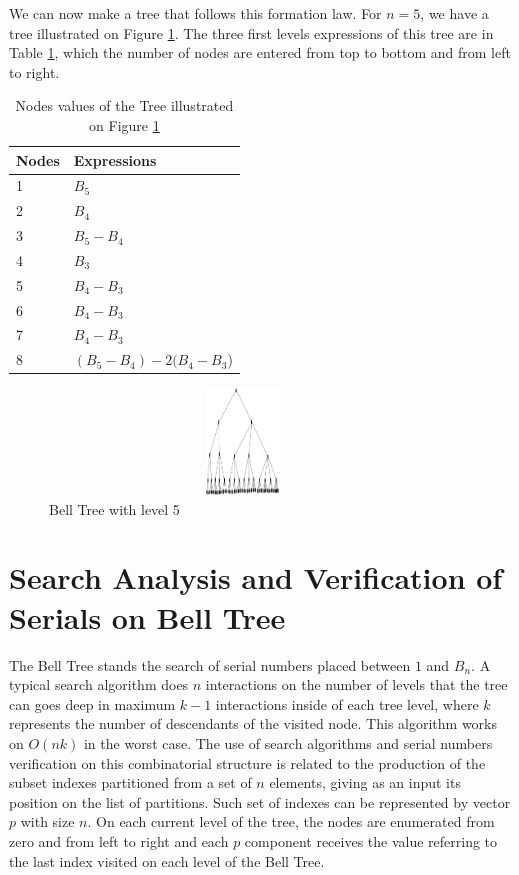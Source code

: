 \documentclass {amsart}
\begin{document}
We can now make a tree that follows this formation law. For {$n = 5$},
we have a tree illustrated on Figure \ref{a1}. The three first levels
expressions of this tree are in Table \ref{t1}, which the number of nodes
are entered from top to bottom and from left to right.

\begin{table}[!hbp]
  \caption{Nodes values of the Tree illustrated on Figure \ref{a1}}
  \label{t1}
\begin{tabular}{l|l}
 \hline
   Nodes  & Expressions  \\
 \hline
    1   & {$B_5$}\\
  \hline
    2   & {$B_4$}\\
  \hline
    3   & {$B_5 - B_4$}\\
  \hline
    4   & {$B_3$}\\
  \hline
    5   & {$B_4 - B_3$}\\
  \hline
    6   & {$B_4 - B_3$}\\
  \hline
    7   & {$B_4 - B_3$}\\
  \hline
    8   & {$(B_5 - B_4) - 2(B_4 - B_3$)}\\
 \end{tabular}
\end{table}

\begin{figure}
  \includegraphics[width=290pt,height=80pt]{BT5}
  \caption{Bell Tree with level 5}\label{a1}
\end{figure}

\section*{Search Analysis and Verification of  Serials on Bell Tree}

The Bell Tree stands the search of serial numbers placed between
{$1$} and {$B_n$}. A typical search algorithm does {$n$}
interactions on the number of levels that the tree can goes deep
in maximum {$k-1$} interactions inside of each tree level, where
{$k$} represents the number of descendants of the visited node.
This algorithm works on {$O(nk)$} in the worst case. The use of
search algorithms and serial numbers verification on this
combinatorial structure is related to the production of the subset
indexes partitioned from a set of {$n$} elements, giving as an
input its position on the list of partitions\cite{me}. Such set of
indexes can be represented by vector {$p$} with size {$n$}. On
each current level of the tree, the nodes are enumerated from zero
and from left to right and each {$p$} component receives the value
referring to the last index visited on each level of the Bell
Tree.
\end{document}

